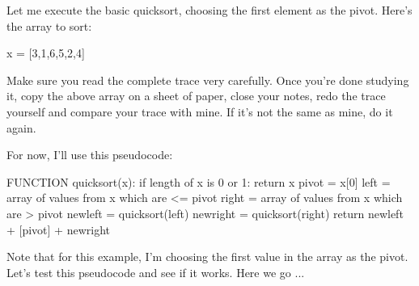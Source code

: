 Let me execute the basic 
quicksort, choosing the first element as the pivot.
Here's the array to sort:
\begin{console}
x = [3,1,6,5,2,4]
\end{console}
Make sure you read the complete trace very carefully.
Once you're done studying it, copy the above array on a sheet of paper,
close your notes, redo the trace yourself and compare your trace with mine.
If it's not the same as mine, do it again.

For now, I'll use this pseudocode:
\begin{console}
FUNCTION quicksort(x):
    if length of x is 0 or 1: return x
    pivot = x[0]
    left = array of values from x which are <= pivot
    right = array of values from x which are > pivot
    newleft = quicksort(left)
    newright = quicksort(right)
    return newleft + [pivot] + newright
\end{console}
Note that for this example,
I'm choosing the first value in the array as the pivot.
Let's test this pseudocode and see if it works.
Here we go ...


